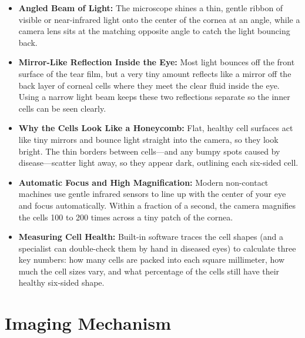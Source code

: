\begin{itemize}
    \item \textbf{Angled Beam of Light:} The microscope shines a thin, gentle ribbon of visible or near-infrared light onto the center of the cornea at an angle, while a camera lens sits at the matching opposite angle to catch the light bouncing back.
    \item \textbf{Mirror-Like Reflection Inside the Eye:} Most light bounces off the front surface of the tear film, but a very tiny amount reflects like a mirror off the back layer of corneal cells where they meet the clear fluid inside the eye. Using a narrow light beam keeps these two reflections separate so the inner cells can be seen clearly.
    \item \textbf{Why the Cells Look Like a Honeycomb:} Flat, healthy cell surfaces act like tiny mirrors and bounce light straight into the camera, so they look bright. The thin borders between cells---and any bumpy spots caused by disease---scatter light away, so they appear dark, outlining each six-sided cell.
    \item \textbf{Automatic Focus and High Magnification:} Modern non-contact machines use gentle infrared sensors to line up with the center of your eye and focus automatically. Within a fraction of a second, the camera magnifies the cells 100 to 200 times across a tiny patch of the cornea.
    \item \textbf{Measuring Cell Health:} Built-in software traces the cell shapes (and a specialist can double-check them by hand in diseased eyes) to calculate three key numbers: how many cells are packed into each square millimeter, how much the cell sizes vary, and what percentage of the cells still have their healthy six-sided shape.
\end{itemize}

\section{Imaging Mechanism}

